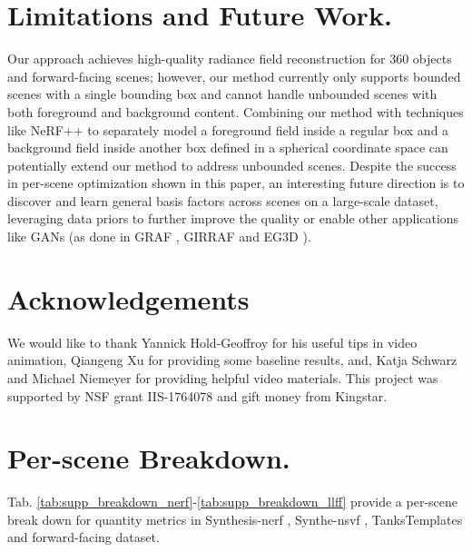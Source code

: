 \documentclass[runningheads]{llncs}
\begin{document}
\section{Limitations and Future Work.}
Our approach achieves high-quality radiance field reconstruction for 360 objects and forward-facing scenes; however, our method currently only supports bounded scenes with a single bounding box and cannot handle unbounded scenes with both foreground and background content. 
Combining our method with techniques like NeRF++ \cite{zhang2020nerf++} to separately model a foreground field inside a regular box and a background field inside another box defined in a spherical coordinate space can potentially extend our method to address unbounded scenes.
Despite the success in per-scene optimization shown in this paper, 
an interesting future direction is to discover and learn general basis factors across scenes on a large-scale dataset, leveraging data priors to further improve the quality or enable other applications like GANs (as done in GRAF \cite{schwarz2020graf}, GIRRAF \cite{niemeyer2021giraffe} and EG3D \cite{Chan2022EG3D}).



\section{Acknowledgements}
We would like to thank Yannick Hold-Geoffroy for his useful tips in video animation, Qiangeng Xu for providing some baseline results, and, Katja Schwarz and Michael Niemeyer for providing helpful video materials. This project was supported by NSF grant IIS-1764078 and gift money from Kingstar. 

\section{Per-scene Breakdown.}
\label{sec:perscene}

Tab. \ref{tab:supp_breakdown_nerf}-\ref{tab:supp_breakdown_llff} provide a per-scene break down for quantity metrics in Synthesis-nerf \cite{martin2021nerf}, Synthe-nsvf \cite{liu2020neural}, TanksTemplates \cite{Knapitsch2017} and forward-facing \cite{llff} dataset.
\end{document}
